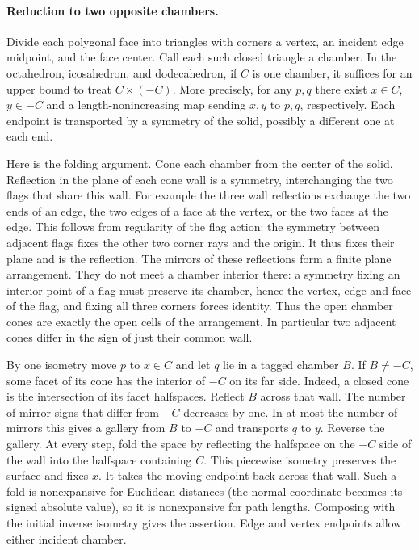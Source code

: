 \documentclass[11pt,letterpaper]{article}
\newcommand{\1}{\mathbf 1}
\begin{document}
\paragraph{Reduction to two opposite chambers.}
Divide each polygonal face into triangles with corners a vertex, an incident edge midpoint, and the face center. Call each such closed triangle a chamber. In the octahedron, icosahedron, and dodecahedron, if $C$ is one chamber, it suffices for an upper bound to treat $C\times(-C)$. More precisely, for any $p,q$ there exist $x\in C$, $y\in-C$ and a length-nonincreasing map sending $x,y$ to $p,q$, respectively. Each endpoint is transported by a symmetry of the solid, possibly a different one at each end.
\par
Here is the folding argument. Cone each chamber from the center of the solid. Reflection in the plane of each cone wall is a symmetry, interchanging the two flags that share this wall. For example the three wall reflections exchange the two ends of an edge, the two edges of a face at the vertex, or the two faces at the edge. This follows from regularity of the flag action: the symmetry between adjacent flags fixes the other two corner rays and the origin. It thus fixes their plane and is the reflection. The mirrors of these reflections form a finite plane arrangement. They do not meet a chamber interior there: a symmetry fixing an interior point of a flag must preserve its chamber, hence the vertex, edge and face of the flag, and fixing all three corners forces identity. Thus the open chamber cones are exactly the open cells of the arrangement. In particular two adjacent cones differ in the sign of just their common wall.
\par
By one isometry move $p$ to $x\in C$ and let $q$ lie in a tagged chamber $B$. If $B\ne-C$, some facet of its cone has the interior of $-C$ on its far side. Indeed, a closed cone is the intersection of its facet halfspaces. Reflect $B$ across that wall. The number of mirror signs that differ from $-C$ decreases by one. In at most the number of mirrors this gives a gallery from $B$ to $-C$ and transports $q$ to $y$. Reverse the gallery. At every step, fold the space by reflecting the halfspace on the $-C$ side of the wall into the halfspace containing $C$. This piecewise isometry preserves the surface and fixes $x$. It takes the moving endpoint back across that wall. Such a fold is nonexpansive for Euclidean distances (the normal coordinate becomes its signed absolute value), so it is nonexpansive for path lengths. Composing with the initial inverse isometry gives the assertion. Edge and vertex endpoints allow either incident chamber.
\end{document}
